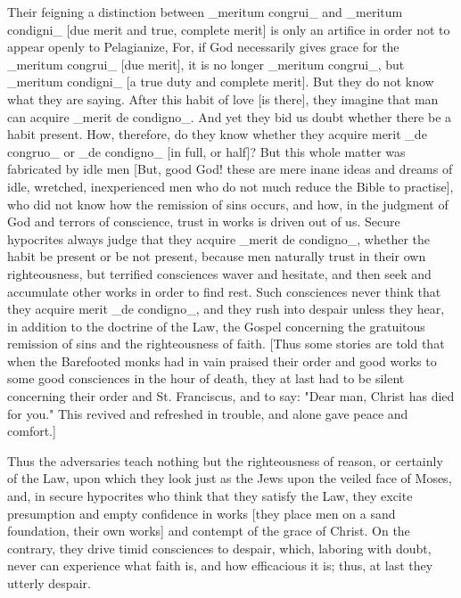 Their feigning a distinction between _meritum congrui_ and _meritum
condigni_ [due merit and true, complete merit] is only an artifice in
order not to appear openly to Pelagianize, For, if God necessarily
gives grace for the _meritum congrui_ [due merit], it is no longer
_meritum congrui_, but _meritum condigni_ [a true duty and complete
merit].  But they do not know what they are saying.  After this habit
of love [is there], they imagine that man can acquire _merit de
condigno_.  And yet they bid us doubt whether there be a habit
present.  How, therefore, do they know whether they acquire merit _de
congruo_ or _de condigno_ [in full, or half]?  But this whole matter
was fabricated by idle men [But, good God! these are mere inane ideas
and dreams of idle, wretched, inexperienced men who do not much
reduce the Bible to practise], who did not know how the remission of
sins occurs, and how, in the judgment of God and terrors of
conscience, trust in works is driven out of us.  Secure hypocrites
always judge that they acquire _merit de condigno_, whether the habit
be present or be not present, because men naturally trust in their
own righteousness, but terrified consciences waver and hesitate, and
then seek and accumulate other works in order to find rest.  Such
consciences never think that they acquire merit _de condigno_, and
they rush into despair unless they hear, in addition to the doctrine
of the Law, the Gospel concerning the gratuitous remission of sins
and the righteousness of faith.  [Thus some stories are told that
when the Barefooted monks had in vain praised their order and good
works to some good consciences in the hour of death, they at last had
to be silent concerning their order and St. Franciscus, and to say:
"Dear man, Christ has died for you." This revived and refreshed in
trouble, and alone gave peace and comfort.]

Thus the adversaries teach nothing but the righteousness of reason,
or certainly of the Law, upon which they look just as the Jews upon
the veiled face of Moses, and, in secure hypocrites who think that
they satisfy the Law, they excite presumption and empty confidence in
works [they place men on a sand foundation, their own works] and
contempt of the grace of Christ.  On the contrary, they drive timid
consciences to despair, which, laboring with doubt, never can
experience what faith is, and how efficacious it is; thus, at last
they utterly despair.

